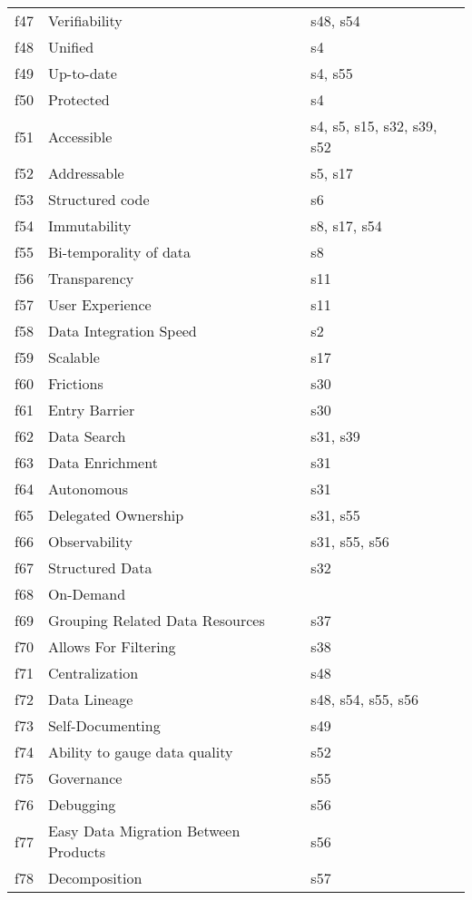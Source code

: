 \begin{tabular}{|c|p{}|p{}|}
f47 & Verifiability & \cellcolor{emerald_shape_1} {s48, s54}\\
f48 & Unified & \cellcolor{emerald_shape_1} {s4}\\
f49 & Up-to-date & \cellcolor{emerald_shape_1} {s4, s55}\\
f50 & Protected & \cellcolor{emerald_shape_1} {s4}\\
f51 & Accessible & \cellcolor{emerald_shape_2} {s4, s5, s15, s32, s39, s52}\\
f52 & Addressable & \cellcolor{emerald_shape_1} {s5, s17}\\
f53 & Structured code & \cellcolor{emerald_shape_1} {s6}\\
f54 & Immutability & \cellcolor{emerald_shape_1} {s8, s17, s54}\\
f55 & Bi-temporality of data & \cellcolor{emerald_shape_1} {s8}\\
f56 & Transparency & \cellcolor{emerald_shape_1} {s11}\\
f57 & User Experience & \cellcolor{emerald_shape_1} {s11}\\
f58 & Data Integration Speed & \cellcolor{emerald_shape_1} {s2}\\
f59 & Scalable & \cellcolor{emerald_shape_1} {s17}\\
f60 & Frictions & \cellcolor{emerald_shape_1} {s30}\\
f61 & Entry Barrier & \cellcolor{emerald_shape_1} {s30}\\
f62 & Data Search & \cellcolor{emerald_shape_1} {s31, s39}\\
f63 & Data Enrichment & \cellcolor{emerald_shape_1} {s31}\\
f64 & Autonomous & \cellcolor{emerald_shape_1} {s31}\\
f65 & Delegated Ownership & \cellcolor{emerald_shape_1} {s31, s55}\\
f66 & Observability & \cellcolor{emerald_shape_1} {s31, s55, s56}\\
f67 & Structured Data & \cellcolor{emerald_shape_1} {s32}\\
f68 & On-Demand & \cellcolor{emerald_shape_1} {}\\
f69 & Grouping Related Data Resources & \cellcolor{emerald_shape_1} {s37}\\
f70 & Allows For Filtering & \cellcolor{emerald_shape_1} {s38}\\
f71 & Centralization & \cellcolor{emerald_shape_1} {s48}\\
f72 & Data Lineage & \cellcolor{emerald_shape_2} {s48, s54, s55, s56}\\
f73 & Self-Documenting & \cellcolor{emerald_shape_1} {s49}\\
f74 & Ability to gauge data quality & \cellcolor{emerald_shape_1} {s52}\\
f75 & Governance & \cellcolor{emerald_shape_1} {s55}\\
f76 & Debugging & \cellcolor{emerald_shape_1} {s56}\\
f77 & Easy Data Migration Between Products & \cellcolor{emerald_shape_1} {s56}\\
f78 & Decomposition & \cellcolor{emerald_shape_1} {s57}\\
\hline
\end{tabular}
